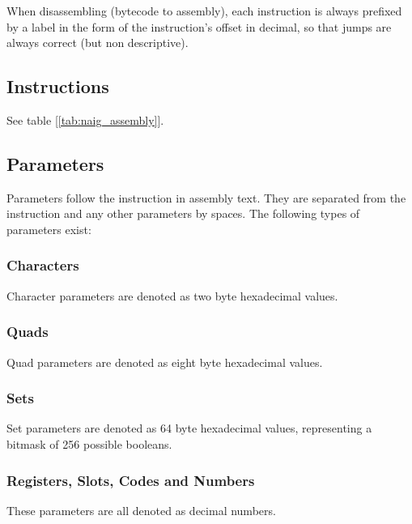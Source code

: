 When disassembling (bytecode to assembly), each instruction is always
prefixed by a label in the form of the instruction's offset in decimal,
so that jumps are always correct (but non descriptive).

\subsection{Instructions}



See table [\ref{tab:naig_assembly}].

\subsection{Parameters}

Parameters follow the instruction in assembly text. They are separated
from the instruction and any other parameters by spaces. The following
types of parameters exist:

\subsubsection{Characters}

Character parameters are denoted as two byte hexadecimal values.

\subsubsection{Quads}

Quad parameters are denoted as eight byte hexadecimal values.

\subsubsection{Sets}

Set parameters are denoted as 64 byte hexadecimal values, representing
a bitmask of 256 possible booleans.

\subsubsection{Registers, Slots, Codes and Numbers}

These parameters are all denoted as decimal numbers.
